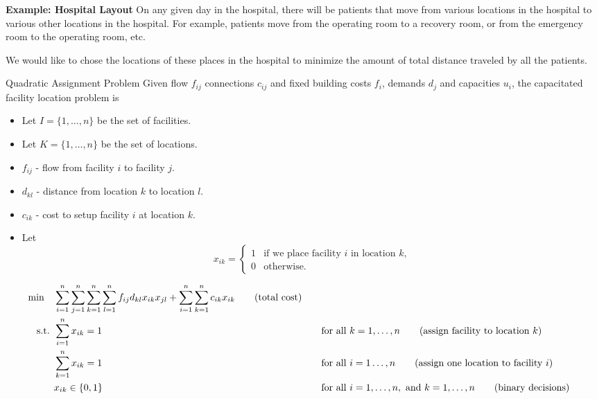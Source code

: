 \textbf{Example:  Hospital Layout}
On any given day in the hospital, there will be patients that move from various locations in the hospital to various other locations in the hospital.  For example, patients move from the operating room to a recovery room, or from the emergency room to the operating room, etc.

We would like to chose the locations of these places in the hospital to minimize the amount of total distance traveled by all the patients. 

\begin{general}{Quadratic Assignment Problem}{\npcomplete}
Given flow $f_{ij}$  connections $c_{ij}$ and fixed building costs $f_i$, demands $d_j$ and capacities $u_i$, the capacitated facility location problem is 

\begin{itemize}
\item Let $I = \{1,\dots, n\}$ be the set of facilities.
\item Let $K = \{1, \dots, n\}$ be the set of locations.
\end{itemize}

\begin{itemize}
\item $f_{ij}$ - flow from facility $i$ to facility $j$.
\item $d_{kl}$ - distance from location $k$ to location $l$.
\item $c_{ik}$ - cost to setup facility $i$ at location $k$.
\end{itemize}

\begin{itemize}
\item Let 
\begin{equation*}
x_{ik} = \begin{cases}
1 & \text{if we place facility $i$ in location $k$,}\\
0 & \text{otherwise.}
\end{cases}
\end{equation*}
\end{itemize}

\begin{align}
\min \quad & \displaystyle\sum_{i=1}^n\sum_{j=1}^n \sum_{k=1}^n \sum_{l = 1}^n f_{ij}d_{kl}x_{ik}x_{jl} + \sum_{i=1}^n \sum_{k = 1}^n c_{ik} x_{ik}   \tag{total cost} \\
\mbox{ s.t. }        & \displaystyle\sum_{i=1}^n x_{ik}=1 &&\quad \mbox{for all } k=1,\dots,n   \tag{assign facility to location $k$} \\
& \displaystyle \sum_{k=1}^n x_{ik}=1 &&\quad \mbox{for all } i=1\dots,n   \tag{assign one location to facility $i$} \\
& x_{ik}\in\{0,1\} &&\quad \mbox{for all } i=1,\dots,n, \mbox{ and } k = 1, \dots, n   \tag{binary decisions}
\end{align}
\end{general}

